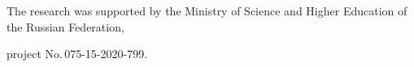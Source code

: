   




\vspace*{-15pt}



  \Ack

  

  \vspace*{-3pt}

  

  \noindent

  The research was supported by the Ministry of Science and Higher Education of the Russian Federation, 

project No.\,075-15-2020-799.



\vspace*{6pt}



